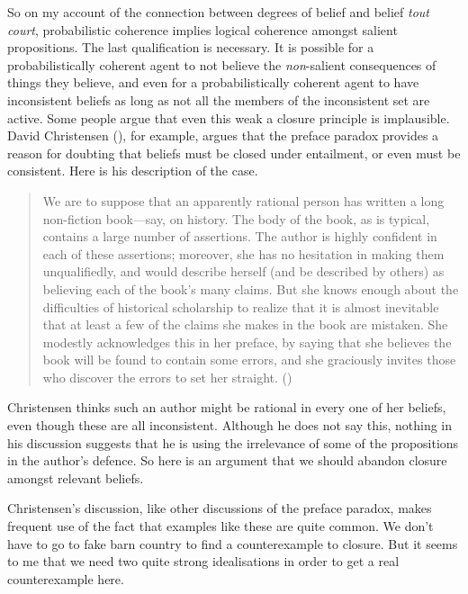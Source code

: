 \documentclass[
  10pt,
  letterpaper,
  DIV=11,
  numbers=noendperiod,
  twoside]{scrartcl}
\begin{document}
So on my account of the connection between degrees of belief and belief
\emph{tout court}, probabilistic coherence implies logical coherence
amongst salient propositions. The last qualification is necessary. It is
possible for a probabilistically coherent agent to not believe the
\emph{non}-salient consequences of things they believe, and even for a
probabilistically coherent agent to have inconsistent beliefs as long as
not all the members of the inconsistent set are active. Some people
argue that even this weak a closure principle is implausible. David
Christensen (), for example, argues
that the preface paradox provides a reason for doubting that beliefs
must be closed under entailment, or even must be consistent. Here is his
description of the case.

\begin{quote}
We are to suppose that an apparently rational person has written a long
non-fiction book---say, on history. The body of the book, as is typical,
contains a large number of assertions. The author is highly confident in
each of these assertions; moreover, she has no hesitation in making them
unqualifiedly, and would describe herself (and be described by others)
as believing each of the book's many claims. But she knows enough about
the difficulties of historical scholarship to realize that it is almost
inevitable that at least a few of the claims she makes in the book are
mistaken. She modestly acknowledges this in her preface, by saying that
she believes the book will be found to contain some errors, and she
graciously invites those who discover the errors to set her straight.
()
\end{quote}

Christensen thinks such an author might be rational in every one of her
beliefs, even though these are all inconsistent. Although he does not
say this, nothing in his discussion suggests that he is using the
irrelevance of some of the propositions in the author's defence. So here
is an argument that we should abandon closure amongst relevant beliefs.

Christensen's discussion, like other discussions of the preface paradox,
makes frequent use of the fact that examples like these are quite
common. We don't have to go to fake barn country to find a
counterexample to closure. But it seems to me that we need two quite
strong idealisations in order to get a real counterexample here.
\end{document}
